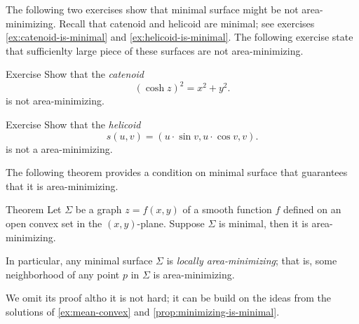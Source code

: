 The following two exercises show that minimal surface might be not area-minimizing.
Recall that catenoid and helicoid are minimal; see exercises \ref{ex:catenoid-is-minimal} and \ref{ex:helicoid-is-minimal}.
The following exercise state that sufficienlty large piece of these surfaces are not area-minimizing.

\begin{thm}{Exercise}\label{ex:catenoid-nonmin}
Show that the \emph{catenoid}
\[(\cosh z)^2=x^2+y^2.\]
is not area-minimizing.
\end{thm}

\begin{thm}{Exercise}\label{ex:helicoid-nonmin}
Show that the \emph{helicoid} 
\[s(u,v)=(u\cdot \sin v,u\cdot \cos v,v).\]
 is not a area-minimizing.
\end{thm}

The following theorem provides a condition on minimal surface that guarantees that it is area-minimizing.

\begin{thm}{Theorem}
Let $\Sigma$ be a graph $z=f(x,y)$ of a smooth function $f$ defined on an open convex set in the $(x,y)$-plane.
Suppose $\Sigma$ is minimal, then it is area-minimizing.

In particular, any minimal surface $\Sigma$ is \emph{locally area-minimizing};
that is, some neighborhood of any point $p$ in $\Sigma$ is area-minimizing.
\end{thm}

We omit its proof altho it is not hard;
it can be build on the ideas from the solutions of \ref{ex:mean-convex} and \ref{prop:minimizing-is-minimal}.

